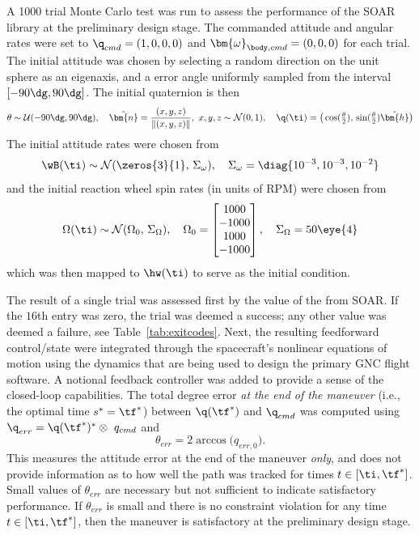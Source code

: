 \documentclass[10pt]{article}
\begin{document}
A 1000 trial Monte Carlo test was run to assess the performance of the SOAR library at the preliminary design stage. The commanded attitude and angular rates were set to $\q_{cmd} = (1,0,0,0)$ and $\bm{\omega}_{\body,cmd}=(0,0,0)$ for each trial. The initial attitude was chosen by selecting a random direction on the unit sphere as an eigenaxis, and a error angle uniformly sampled from the interval $[-90\dg,90\dg]$. The initial quaternion is then
\begin{equation}
\theta \sim \mathcal{U}(-90\dg,90\dg), \quad \hat{\bm{n}} = \frac{(x,y,z)}{\|(x,y,z)\|}, \ x,y,z\sim\mathcal{N}(0,1), \quad \q(\ti) = \big(\cos(\tfrac{\theta}{2}),\,\sin(\tfrac{\theta}{2})\hat{\bm{h}} \big)
\end{equation} 
The initial attitude rates were chosen from
\begin{equation}
\wB(\ti) \sim \mathcal{N}(\zeros{3}{1},\,\Sigma_{\omega}), \quad \Sigma_{\omega} = \diag{10^{-3},10^{-3},10^{-2}}
\end{equation}
and the initial reaction wheel spin rates (in units of RPM) were chosen from
\begin{equation}
\Omega(\ti) \sim \mathcal{N}(\Omega_0,\,\Sigma_{\Omega}), \quad \Omega_0 = \begin{bmatrix}
1000 \\ -1000 \\ 1000 \\ -1000
\end{bmatrix}, \quad \Sigma_{\Omega} = 50\eye{4}
\end{equation}
which was then mapped to $\hw(\ti)$ to serve as the initial condition. 

The result of a single trial was assessed first by the value of the  from SOAR. If the $16$th entry was zero, the trial was deemed a success; any other value was deemed a failure, see Table~\ref{tab:exitcodes}. Next, the resulting feedforward control/state were integrated through the spacecraft's nonlinear equations of motion using the dynamics that are being used to design the primary GNC flight software. A notional feedback controller was added to provide a sense of the closed-loop capabilities. The total degree error \textit{at the end of the maneuver} (i.e., the optimal time $s^* = \tf^*$) between $\q(\tf^*)$ and $\q_{cmd}$ was computed using $\q_{err} = \q(\tf^*)^* \otimes\ q_{cmd}$ and
\begin{equation}
\theta_{err} = 2 \arccos \big( q_{err,0} \big).
\end{equation} 
This measures the attitude error at the end of the maneuver \textit{only}, and does not provide information as to how well the path was tracked for times $t\in[\ti,\tf^*]$. Small values of $\theta_{err}$ are necessary but not sufficient to indicate satisfactory performance. If $\theta_{err}$ is small and there is no constraint violation for any time $t\in[\ti,\tf^*]$, then the maneuver is satisfactory at the preliminary design stage. 
\end{document}
